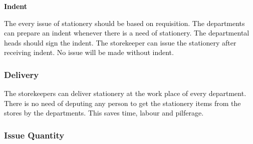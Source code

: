 \documentclass[12pt]{report}
\renewcommand{\_}{\kern-1.5pt\textunderscore\kern-1.5pt}
\begin{document}
\vspace{\baselineskip}
\begin{adjustwidth}{0.2in}{0.84in}
\begin{justify}
{\fontsize{14pt}{16.8pt}\selectfont \textbf{\textcolor[HTML]{0D0D0D}{Indent}}\par}
\end{justify}\par

\end{adjustwidth}

\setlength{\parskip}{16.8pt}
\begin{adjustwidth}{0.2in}{0.84in}
\begin{justify}
\textcolor[HTML]{0D0D0D}{The every issue of stationery should be based on requisition. The departments can prepare an indent whenever there is a need of stationery. The departmental heads should sign the indent. The storekeeper can issue the stationery after receiving indent. No issue will be made without indent.}
\end{justify}\par

\end{adjustwidth}


\vspace{\baselineskip}
\begin{adjustwidth}{0.2in}{0.84in}
\subsubsection*{Delivery}
\end{adjustwidth}

\begin{adjustwidth}{0.2in}{0.84in}
\textcolor[HTML]{0D0D0D}{The storekeepers can deliver stationery at the work place of every department. There is no need of deputing any person to get the stationery items from the stores by the departments. This saves time, labour and pilferage.}\par

\end{adjustwidth}


\vspace{\baselineskip}
\begin{adjustwidth}{0.2in}{0.84in}
\subsubsection*{Issue Quantity}
\end{adjustwidth}
\end{document}
